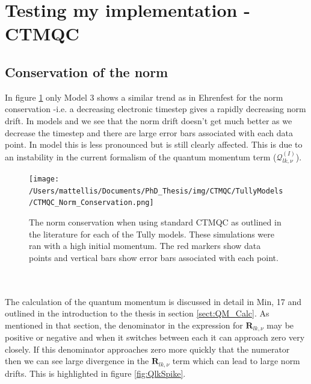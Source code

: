 \section{Testing my implementation -CTMQC}
\subsection{Conservation of the norm}
In figure \ref{fig:CTMQCNormCons} only Model 3 shows a similar trend as in Ehrenfest for the norm conservation -i.e. a decreasing electronic timestep gives a rapidly decreasing norm drift. In models  and  we see that the norm drift doesn't get much better as we decrease the timestep and there are large error bars associated with each data point. In model  this is less pronounced but is still clearly affected. This is due to an instability in the current formalism of the quantum momentum term ($\mathcal{Q}_{lk, \nu}^{(I)}$).
\begin{figure}[ht]
	\texttt{[image: /Users/mattellis/Documents/PhD\_Thesis/img/CTMQC/TullyModels/CTMQC\_Norm\_Conservation.png]}
	\caption{\label{fig:CTMQCNormCons}The norm conservation when using standard CTMQC as outlined in the literature for each of the Tully models. These simulations were ran with a high initial momentum. The red markers show data points and vertical bars show error bars associated with each point.}
\end{figure}
\\\\
The calculation of the quantum momentum is discussed in detail in Min, 17 \cite{min_ab_2017} and outlined in the introduction to the thesis in section \ref{sect:QM_Calc}. As mentioned in that section, the denominator in the expression for $\mathbf{R}_{lk, \nu}$ may be positive or negative and when it switches between each it can approach zero very closely. If this denominator approaches zero more quickly that the numerator then we can see large divergence in the $\mathbf{R}_{lk, \nu}$ term which can lead to large norm drifts. This is highlighted in figure \ref{fig:QlkSpike}.

